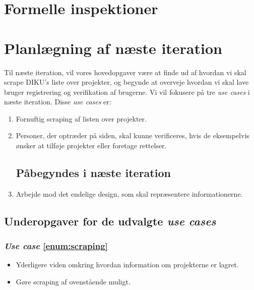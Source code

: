 \documentclass[11pt]{article}
\begin{document}
\section{Formelle inspektioner}

\section{Planlægning af næste iteration}
Til næste iteration, vil vores hovedopgaver være at finde ud af hvordan vi skal scrape DIKU's liste over projekter, og begynde at overveje hvordan vi skal lave bruger registrering og verifikation af brugerne.
Vi vil fokusere på tre \textit{use cases} i næste iteration. Disse \textit{use cases} er:
\begin{enumerate}
\subsection*{Forventes implementeret i næste iteration}
	\item \label{enum:scraping} Fornuftig scraping af listen over projekter.

	\item \label{enum:verifikation} Personer, der optræder på siden, skal kunne verificeres, hvis de eksempelvis ønsker at tilføje projekter eller foretage rettelser.

\subsection*{Påbegyndes i næste iteration}

	\item \label{enum:design} Arbejde mod det endelige design, som skal repræsentere informationerne. 
\end{enumerate}

\subsection{Underopgaver for de udvalgte \textit{use cases}}
\subsubsection*{\textit{Use case} \ref{enum:scraping}}
\begin{itemize}
	\item Yderligere viden omkring hvordan information om projekterne er lagret.
	\item Gøre scraping af ovenstående muligt.
\end{itemize}
\end{document}
